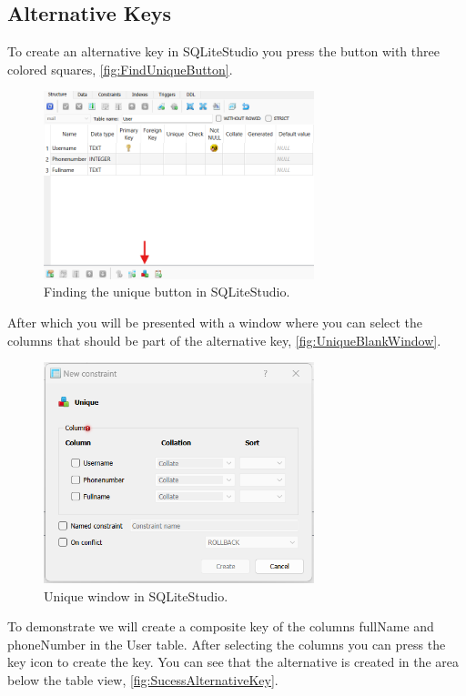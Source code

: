 \documentclass[a4paper,11pt,oneside]{article}
\begin{document}
\begin{sloppypar}
\subsection{Alternative Keys}
\label{sqliteStudioAlternativeKeys}
To create an alternative key in SQLiteStudio you press the button with three colored squares, \autoref{fig:FindUniqueButton}. 
\begin{figure}[!htb]
  \centering
  \includegraphics[width=0.7\textwidth]{sqlitestudio/alternative_key/unique_symbol_square.png}
  \caption{Finding the unique button in SQLiteStudio.}
  \label{fig:FindUniqueButton}
\end{figure}
After which you will be presented with a window where you can select the columns that should be part of the alternative key, \autoref{fig:UniqueBlankWindow}.
\begin{figure}[!htb]
  \centering
  \includegraphics[width=0.7\textwidth]{sqlitestudio/alternative_key/alternative_key_blank.png}
  \caption{Unique window in SQLiteStudio.}
  \label{fig:UniqueBlankWindow}
\end{figure}
To demonstrate we will create a composite key of the columns fullName and phoneNumber in the User table. After selecting the columns you can press the key icon to create the key. You can see that the alternative is created in the area below the table view, \autoref{fig:SucessAlternativeKey}.

\end{sloppypar}
\end{document}
